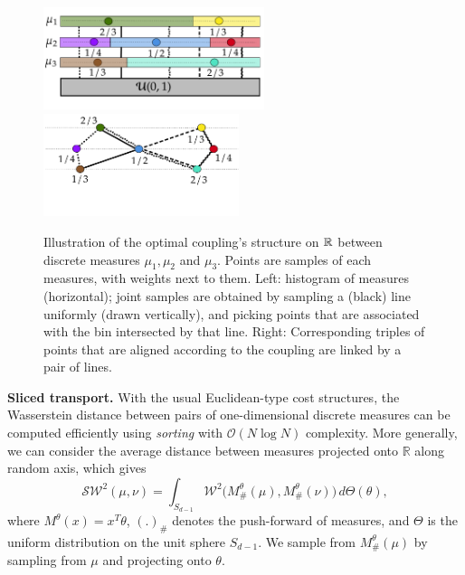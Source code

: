 \begin{figure}
	\centering
	\includegraphics[height=3cm]{pictures/diagrams/diagram_uniform.pdf}
	\hspace{5mm}
	\includegraphics[height=3cm]{pictures/diagrams/diagram_alignment.pdf}
	\caption{Illustration of the optimal coupling's structure on $\mathbb{R}$ between discrete measures $\mu_1, \mu_2$ and $\mu_3$. Points are samples of each measures, with weights next to them.  Left: histogram of measures (horizontal); joint samples are obtained by sampling a (black) line uniformly (drawn vertically), and picking points that are associated with the bin intersected by that line. Right: Corresponding triples of points that are aligned according to the coupling are linked by a pair of lines.}
	\label{fig:illustr_mmot}
\end{figure}
\textbf{Sliced transport.}  With the usual Euclidean-type cost structures, the Wasserstein distance between pairs of one-dimensional discrete measures can be computed efficiently using \emph{sorting}  with $\mathcal{O}(N \log N)$ complexity.
More generally, we can consider the average distance between measures projected onto $\mathbb{R}$ along random axis, which gives \cite{bonnottee, bonneel}
\[
\mathcal{SW}^2(\mu, \nu) = \int_{S_{d-1}}\mathcal{W}^2\big(M^{\theta}_{\#}(\mu), M^{\theta}_{\#}(\nu)\big) \, d\Theta(\theta),
\]
where $M^{\theta}(x) = x^T \theta$, $(.)_\#$ denotes the push-forward of measures, and $\Theta$ is the uniform distribution on the unit sphere $S_{d-1}$. We sample from $M^{\theta}_{\#}(\mu)$ by sampling from $\mu$ and  projecting onto $\theta$.



